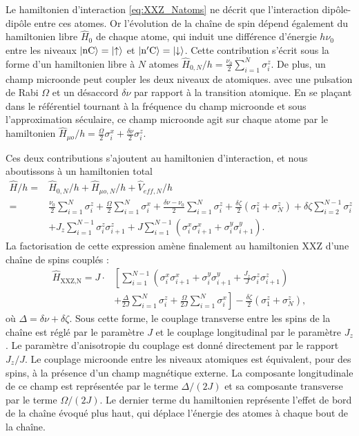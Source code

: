 Le hamiltonien d'interaction \eqref{eq:XXZ_Natoms} ne décrit que l'interaction dipôle-dipôle entre ces atomes.
Or l'évolution de la chaîne de spin dépend également du hamiltonien libre $\hat{H}_0$ de chaque atome, qui induit une différence d'énergie $h\nu_0$ entre les niveaux $\ket{\mathrm{nC}}=\ket{\uparrow}$ et $\ket{\mathrm{n'C}}=\ket{\downarrow}$.
Cette contribution s'écrit sous la forme d'un hamiltonien libre à $N$ atomes $\hat{H}_{0,N}/h = \frac{\nu_0}{2} \sum_{i=1}^{N}\sigma_i^z$.
De plus, un champ microonde peut coupler les deux niveaux de atomiques.
avec une pulsation de Rabi $\Omega$ et un désaccord $\delta\nu$ par rapport à la transition atomique.
En se plaçant dans le référentiel tournant à la fréquence du champ microonde et sous l'approximation séculaire, ce champ microonde agit sur chaque atome par le hamiltonien $\hat{H}_{\mu o}/h = \frac{\Omega}{2}\sigma_i^x + \frac{\delta\nu}{2} \sigma_i^z$.

Ces deux contributions s'ajoutent au hamiltonien d'interaction, et nous aboutissons à un hamiltonien total
%
\begin{equation}
\label{eq:hamilt_tot_N}
\begin{aligned}
\hat{H}/h =& \hat{H}_{0,N}/h + \hat{H}_{\mu o,N}/h + \hat{V}_{eff,N}/h \\
=& \frac{\nu_0}{2} \sum_{i=1}^{N}\sigma_i^z + \frac{\Omega}{2}\sum_{i=1}^{N}\sigma_i^x + \frac{\delta\nu-\nu_0}{2}\sum_{i=1}^{N}\sigma_i^z 
+\frac{\delta\zeta}{2} \left( \sigma_1^z + \sigma_N^z \right)
+ \delta\zeta \sum_{i=2}^{N-1} \sigma_i^z \\
&+ J_z \sum_{i=1}^{N-1} \sigma_i^z \sigma_{i+1}^z
+ J \sum_{i=1}^{N-1} \left( \sigma_i^x \sigma_{i+1}^x + \sigma_i^y \sigma_{i+1}^y \right).
\end{aligned}
\end{equation}
%
La factorisation de cette expression amène finalement au hamiltonien \og XXZ \fg{} d'une chaîne de spins couplés :
\begin{equation}
\label{eq:XXZ_Natoms}
\begin{aligned}
\hat{H}_{\text{XXZ,N}} =
J\cdot & \left[
\sum_{i=1}^{N-1} \left( \sigma_i^x\sigma_{i+1}^x 
+ \sigma_i^y \sigma_{i+1}^y
+ \frac{J_z}{J} \sigma_i^z\sigma_{i+1}^z \right) \right. \\
&\left. + \frac{\Delta}{2J}\sum_{i=1}^{N} \sigma_i^z
+ \frac{\Omega}{2J}\sum_{i=1}^{N} \sigma_i^x \right]
- \frac{\delta\zeta}{2}\left( \sigma_1^z + \sigma_N^z \right),
\end{aligned}
\end{equation}
où $\Delta=\delta\nu+\delta\zeta$.
Sous cette forme, le couplage transverse entre les spins de la chaîne est réglé par le paramètre $J$ et le couplage longitudinal par le paramètre $J_z$.
Le paramètre d'anisotropie du couplage est donné directement par le rapport $J_z/J$.
Le couplage microonde entre les niveaux atomiques est équivalent, pour des spins, à la présence d'un champ magnétique externe.
La composante longitudinale de ce \og champ \fg{} est représentée par le terme $\Delta/(2J)$ et sa composante transverse par le terme $\Omega/(2J)$.
Le dernier terme du hamiltonien représente l'effet de bord de la chaîne évoqué plus haut, qui déplace l'énergie des atomes à chaque bout de la chaîne.

